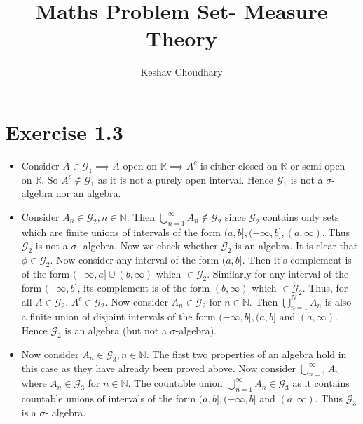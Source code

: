 \documentclass{article}
\title{Maths Problem Set- Measure Theory}
\author{Keshav Choudhary}
\begin{document}
  \maketitle

  \section*{Exercise 1.3}
    \begin{itemize}

      \item Consider $A \in \mathcal{G}_1 \implies A$ open on $\mathbb{R}\implies {A}^c$
      is either closed on $\mathbb{R}$ or semi-open on $\mathbb{R}$. So ${A}^c \notin \mathcal{G}_1$
      as it is not a purely open interval. Hence $\mathcal{G}_1$ is not a $\sigma$- algebra nor an algebra.

      \item Consider $A_n \in \mathcal{G}_2, n \in \mathbb{N}$. Then $\bigcup_{n=1}^{\infty}A_n \notin \mathcal{G}_2$
      since $\mathcal{G}_2$ contains only sets which are finite unions of intervals of the form $(a, b], (-\infty, b], (a, \infty)$.
      Thus $\mathcal{G}_2$ is not a $\sigma$- algebra. Now we check whether $\mathcal{G}_2$  is an algebra.
      It is clear that $\phi \in \mathcal{G}_2$. Now consider any interval of the form $(a,b]$.
      Then it's complement is of the form $(-\infty,a] \cup (b, \infty)$ which $\in \mathcal{G}_2$. Similarly for any interval of the form
      $(-\infty, b]$, its complement is of the form $(b, \infty)$ which $\in \mathcal{G}_2$. Thus, for all $A \in \mathcal{G}_2$, ${A}^c \in \mathcal{G}_2$.
      Now consider ${A}_n \in \mathcal{G}_2$ for $n \in \mathbb{N}$. Then $\bigcup_{n=1}^{N}A_{n}$ is also a finite union
      of disjoint intervals of the form $(-\infty, b], (a,b]$ and  $(a, \infty)$. Hence $\mathcal{G}_2$ is an algebra (but not a $\sigma$-algebra).

      \item Now consider $A_n \in \mathcal{G}_3, n \in \mathbb{N}$. The first two properties of an algebra hold in this case
      as they have already been proved above. Now consider $\bigcup_{n=1}^{\infty}A_{n}$ where ${A}_n \in \mathcal{G}_3$ for $n \in \mathbb{N}$.
      The countable union $\bigcup_{n=1}^{\infty}A_{n} \in \mathcal{G}_3$ as it contains countable unions of intervals of the form
      $(a,b], (-\infty, b]$ and $(a, \infty)$. Thus $\mathcal{G}_3$ is a $\sigma$- algebra.

    \end{itemize}
\end{document}
